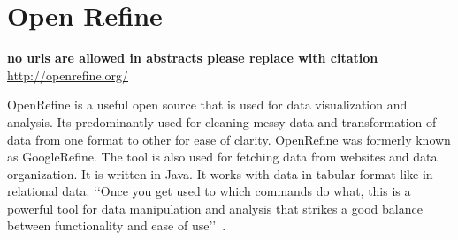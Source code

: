 \section{Open Refine}


{\bf no urls are allowed in abstracts please replace with citation}
\url{http://openrefine.org/}

OpenRefine is a useful open source that is used for data visualization
and analysis.  Its predominantly used for cleaning messy data and
transformation of data from one format to other for ease of clarity.
OpenRefine was formerly known as GoogleRefine. The tool is also used
for fetching data from websites and data organization.  It is written
in Java. It works with data in tabular format like in relational
data. ‘‘Once you get used to which commands do what, this is a
powerful tool for data manipulation and analysis that strikes a good
balance between functionality and ease of
use’’~\cite{hid-sp18-417-openrefine}.

